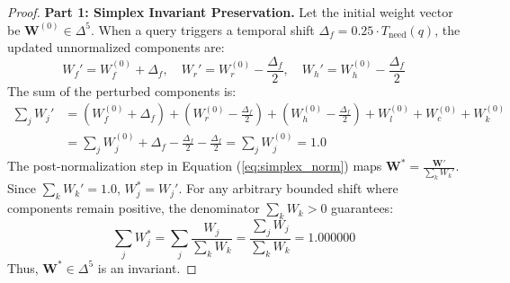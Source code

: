 \begin{proof}
\textbf{Part 1: Simplex Invariant Preservation.}
Let the initial weight vector be $\mathbf{W}^{(0)} \in \Delta^5$. When a query triggers a temporal shift $\Delta_f = 0.25 \cdot T_{\text{need}}(q)$, the updated unnormalized components are:
\begin{equation}
    W_f' = W_f^{(0)} + \Delta_f, \quad W_r' = W_r^{(0)} - \frac{\Delta_f}{2}, \quad W_h' = W_h^{(0)} - \frac{\Delta_f}{2}
\end{equation}
The sum of the perturbed components is:
\begin{equation}
    \begin{aligned}
        \sum_{j} W_j' &= (W_f^{(0)} + \Delta_f) + \left(W_r^{(0)} - \frac{\Delta_f}{2}\right) + \left(W_h^{(0)} - \frac{\Delta_f}{2}\right) + W_l^{(0)} + W_c^{(0)} + W_k^{(0)} \\
        &= \sum_{j} W_j^{(0)} + \Delta_f - \frac{\Delta_f}{2} - \frac{\Delta_f}{2} = \sum_{j} W_j^{(0)} = 1.0
    \end{aligned}
\end{equation}
The post-normalization step in Equation (\ref{eq:simplex_norm}) maps $\mathbf{W}^* = \frac{\mathbf{W}'}{\sum_k W_k'}$. Since $\sum_k W_k' = 1.0$, $W_j^* = W_j'$. For any arbitrary bounded shift where components remain positive, the denominator $\sum_k W_k > 0$ guarantees:
\begin{equation}
    \sum_{j} W_j^* = \sum_{j} \frac{W_j}{\sum_k W_k} = \frac{\sum_j W_j}{\sum_k W_k} = 1.000000
\end{equation}
Thus, $\mathbf{W}^* \in \Delta^5$ is an invariant.


\end{proof}
